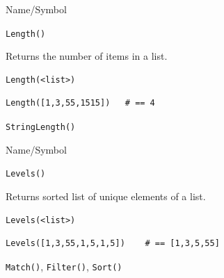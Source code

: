\begin{desc}{Name/Symbol}
\item[Name/Symbol]	\verb+Length()+

\item[Description]	Returns the number of items in a list.

\item[Usage]
\begin{verbatim}
Length(<list>)
\end{verbatim}

\item[Example]
\begin{verbatim}
Length([1,3,55,1515])	# == 4
\end{verbatim}

\item[See Also]	\verb+StringLength()+
\end{desc}

\begin{desc}{Name/Symbol}
\item[Name/Symbol]	\verb+Levels()+

\item[Description]	Returns sorted list of unique elements of a list.

\item[Usage]
\begin{verbatim}
Levels(<list>)
\end{verbatim}

\item[Example]
\begin{verbatim}
Levels([1,3,55,1,5,1,5])	# == [1,3,5,55]
\end{verbatim}

\item[See Also]	\verb+Match()+, \verb+Filter()+, \verb+Sort()+
\end{desc}


